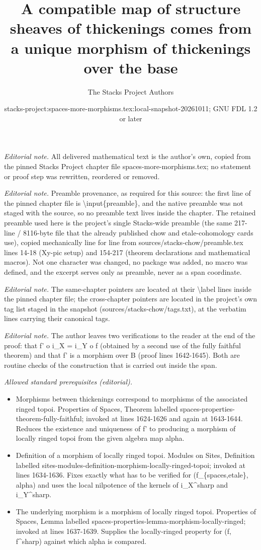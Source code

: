 \documentclass[10pt,a4paper]{amsart}
\title{A compatible map of structure sheaves of thickenings comes from a unique morphism of thickenings over the base}
\author{The Stacks Project Authors}
\date{stacks-project:spaces-more-morphisms.tex:local-snapshot-20261011; GNU FDL 1.2 or later}
\theoremstyle{plain}
\theoremstyle{definition}
\theoremstyle{remark}
\numberwithin{equation}{subsection}
\begin{document}
\maketitle
\noindent\textit{Editorial note.} All delivered mathematical text is the author's own, copied from the pinned Stacks Project chapter file spaces-more-morphisms.tex; no statement or proof step was rewritten, reordered or removed.\par\medskip
\noindent\textit{Editorial note.} Preamble provenance, as required for this source: the first line of the pinned chapter file is \textbackslash{}input\{preamble\}, and the native preamble was not staged with the source, so no preamble text lives inside the chapter. The retained preamble used here is the project's single Stacks-wide preamble (the same 217-line / 8116-byte file that the already published chow and etale-cohomology cards use), copied mechanically line for line from sources/stacks-chow/preamble.tex lines 14-18 (Xy-pic setup) and 154-217 (theorem declarations and mathematical macros). Not one character was changed, no package was added, no macro was defined, and the excerpt serves only as preamble, never as a span coordinate.\par\medskip
\noindent\textit{Editorial note.} The same-chapter pointers are located at their \textbackslash{}label lines inside the pinned chapter file; the cross-chapter pointers are located in the project's own tag list staged in the snapshot (sources/stacks-chow/tags.txt), at the verbatim lines carrying their canonical tags.\par\medskip
\noindent\textit{Editorial note.} The author leaves two verifications to the reader at the end of the proof: that f' o i\_X = i\_Y o f (obtained by a second use of the fully faithful theorem) and that f' is a morphism over B (proof lines 1642-1645). Both are routine checks of the construction that is carried out inside the span.\par\medskip
\noindent\textit{Allowed standard prerequisites (editorial).}\begin{itemize}
\item Morphisms between thickenings correspond to morphisms of the associated ringed topoi. Properties of Spaces, Theorem labelled spaces-properties-theorem-fully-faithful; invoked at lines 1624-1626 and again at 1643-1644. Reduces the existence and uniqueness of f' to producing a morphism of locally ringed topoi from the given algebra map alpha.
\item Definition of a morphism of locally ringed topoi. Modules on Sites, Definition labelled sites-modules-definition-morphism-locally-ringed-topoi; invoked at lines 1634-1636. Fixes exactly what has to be verified for (f\_\{spaces,etale\}, alpha) and uses the local nilpotence of the kernels of i\_X\textasciicircum{}sharp and i\_Y\textasciicircum{}sharp.
\item The underlying morphism is a morphism of locally ringed topoi. Properties of Spaces, Lemma labelled spaces-properties-lemma-morphism-locally-ringed; invoked at lines 1637-1639. Supplies the locally-ringed property for (f, f\textasciicircum{}sharp) against which alpha is compared.
\end{itemize}\medskip
\end{document}
